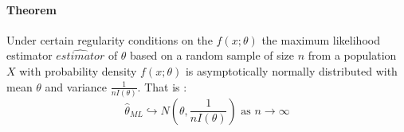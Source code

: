 \paragraph{Theorem}
Under certain regularity conditions on the $f(x;\theta)$ the maximum
likelihood estimator $\hat{estimator}$ of $\theta$ based on a random
sample of size $n$ from a population $X$ with probability density 
$f(x;\theta)$ is asymptotically normally distributed with mean 
$\theta$ and variance $\frac{1}{nI(\theta)}$. That is :
$$
\hat{\theta}_{ML} \hookrightarrow N\left( \theta,\frac{1}{nI(\theta)} \right)\text{ as }n\rightarrow\infty
$$
